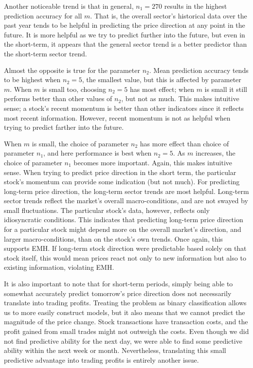 \documentclass[pageno]{jpaper}
\begin{document}
\newpage
Another noticeable trend is that in general, $n_1 = 270$ results in the highest prediction accuracy for all $m$. That is, the overall sector’s historical data over the past year tends to be helpful in predicting the price direction at any point in the future. It is more helpful as we try to predict further into the future, but even in the short-term, it appears that the general sector trend is a better predictor than the short-term sector trend.

Almost the opposite is true for the parameter $n_2$. Mean prediction accuracy tends to be highest when $n_2 = 5$, the smallest value, but this is affected by parameter $m$. When $m$ is small too, choosing $n_2=5$ has most effect; when $m$ is small it still performs better than other values of $n_2$, but not as much.  This makes intuitive sense; a stock’s recent momentum is better than other indicators since it reflects most recent information. However, recent momentum is not as helpful when trying to predict farther into the future.

When $m$ is small, the choice of parameter $n_2$ has more effect than choice of parameter $n_1$, and here performance is best when $n_2 = 5$. As $m$ increases, the choice of parameter $n_1$ becomes more important. Again, this makes intuitive sense. When trying to predict price direction in the short term, the particular stock’s momentum can provide some indication (but not much). For predicting long-term price direction, the long-term sector trends are most helpful. Long-term sector trends reflect the market’s overall macro-conditions, and are not swayed by small fluctuations. The particular stock’s data, however, reflects only idiosyncratic conditions. This indicates that predicting long-term price direction for a particular stock might depend more on the overall market’s direction, and larger macro-conditions, than on the stock’s own trends. Once again, this supports EMH. If long-term stock direction were predictable based solely on that stock itself, this would mean prices react not only to new information but also to existing information, violating EMH.

It is also important to note that for short-term periods, simply being able to somewhat accurately predict tomorrow's price direction does not necessarily translate into trading profits. Treating the problem as binary classification allows us to more easily construct models, but it also means that we cannot predict the magnitude of the price change. Stock transactions have transaction costs, and the profit gained from small trades might not outweigh the costs.  Even though we did not find predictive ability for the next day, we were able to find some predictive ability within the next week or month. Nevertheless, translating this small predictive advantage into trading profits is entirely another issue.
\end{document}

